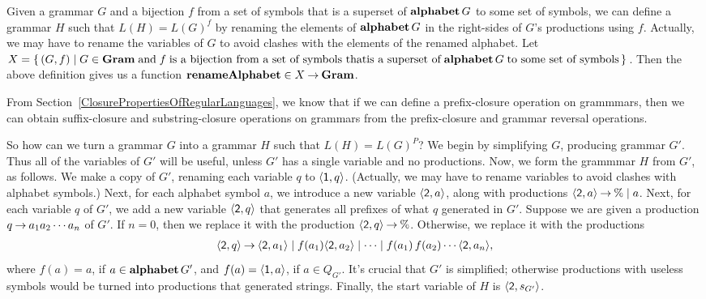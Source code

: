 Given a grammar $G$ and a bijection $f$ from a set of symbols that is
a superset of $\mathbf{alphabet}\,G$ to some set of symbols, we can define a
grammar $H$ such that $L(H)=L(G)^f$ by renaming the elements of
%
%
%
%
$\mathbf{alphabet}\,G$ in the right-sides of $G$'s productions using $f$.
Actually, we may have to rename the variables of $G$ to avoid clashes
with the elements of the renamed alphabet.  Let
$X=\{ \, (G,f) \mid G\in\mathbf{Gram}\;\allowbreak\mbox{and}\allowbreak\;f\;\allowbreak\mbox{is a bijection from a
    set of symbols that}\allowbreak\allowbreak\mbox{is a superset
    of}\allowbreak\;\mathbf{alphabet}\,G\;\allowbreak\mbox{to some set of symbols}\allowbreak \, \}$.  Then the above
definition gives us a function
$\mathbf{renameAlphabet}\in X\mathbin{\to}\mathbf{Gram}$.

From Section~\ref{ClosurePropertiesOfRegularLanguages},
we know that if we can define a prefix-closure operation
%
%
%
%
%
%
%
%
%
%
%
%
on grammmars, then we can obtain suffix-closure and substring-closure
operations on grammars from the prefix-closure and grammar reversal
operations.

So how can we turn a grammar $G$ into a grammar $H$ such that
$L(H)=L(G)^P$?
We begin by simplifying $G$, producing grammar $G'$.
Thus all of the variables of $G'$ will be useful, unless $G'$ has
a single variable and no productions.  Now, we form the grammmar $H$
from $G'$, as follows.
We make a copy of $G'$, renaming each variable $q$ to
$\langle\mathsf{1},q\rangle$.  (Actually, we may have to rename variables
to avoid clashes with alphabet symbols.)
Next, for each alphabet symbol $a$, we introduce a new variable
$\langle\mathsf{2},a\rangle$, along with productions
$\langle\mathsf{2},a\rangle\mathbin{\to}\%\mid a$.
Next, for each variable $q$ of $G'$, we add a new variable
$\langle\mathsf{2},q\rangle$ that generates all prefixes of what $q$
generated in $G'$.  Suppose we are given a production $q\mathbin{\to}
a_1a_2\cdots a_n$ of $G'$.  If $n=0$, then we replace it with the
production $\langle\mathsf{2},q\rangle\mathbin{\to}\%$.  Otherwise, we replace it
with the productions
\begin{gather*}
\langle\mathsf{2},q\rangle\mathbin{\to}
\langle\mathsf{2},a_1\rangle \mid
f(a_1)\langle\mathsf{2},a_2\rangle \mid \cdots \mid
f(a_1)\,f(a_2)\cdots\langle\mathsf{2},a_n\rangle ,
\end{gather*}
where $f(a) = a$, if $a\in\mathbf{alphabet}\,G'$, and
$f(a)=\langle\mathsf{1},a\rangle$, if $a\in Q_{G'}$.  It's crucial that
$G'$ is simplified; otherwise productions with useless symbols would
be turned into productions that generated strings. Finally, the start
variable of $H$ is $\langle\mathsf{2},s_{G'}\rangle$.

